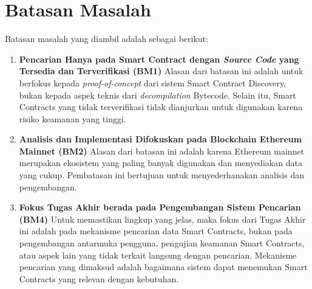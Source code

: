 \section{Batasan Masalah}
\label{sec:batasan-masalah}


Batasan masalah yang diambil adalah sebagai berikut:

\begin{enumerate}
	\item \textbf{Pencarian Hanya pada Smart Contract dengan \textit{Source Code} yang Tersedia dan Terverifikasi (BM1)} \newline
	      Alasan dari batasan ini adalah untuk berfokus kepada \textit{proof-of-concept} dari sistem Smart Contract Discovery, bukan kepada aspek teknis dari \textit{decompilation} Bytecode. Selain itu, Smart Contracts yang tidak terverifikasi tidak dianjurkan untuk digunakan karena risiko keamanan yang tinggi.
	\item \textbf{Analisis dan Implementasi Difokuskan pada Blockchain Ethereum Mainnet (BM2)} \newline
	      Alasan dari batasan ini adalah karena Ethereum mainnet merupakan ekosistem yang paling banyak digunakan dan menyediakan data yang cukup. Pembatasan ini bertujuan untuk menyederhanakan analisis dan pengembangan.
	\item \textbf{Fokus Tugas Akhir berada pada Pengembangan Sistem Pencarian (BM4)} \newline
	      Untuk memastikan lingkup yang jelas, maka fokus dari Tugas Akhir ini adalah pada mekanisme pencarian data Smart Contracts, bukan pada pengembangan antarmuka pengguna, pengujian keamanan Smart Contracts, atau aspek lain yang tidak terkait langsung dengan pencarian. Mekanisme pencarian yang dimaksud adalah bagaimana sistem dapat menemukan Smart Contracts yang relevan dengan kebutuhan.
\end{enumerate}